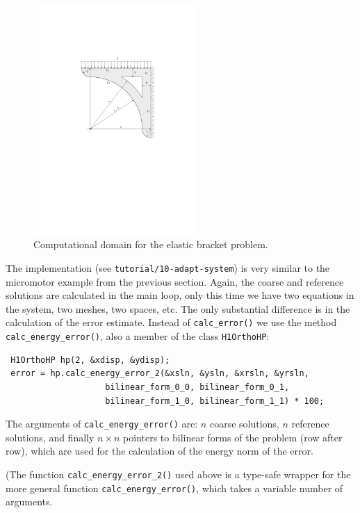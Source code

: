 \documentclass[11pt]{article}
\begin{document}
\begin{figure}[!ht]
  \medskip \centering
  \includegraphics[width=0.55\textwidth]{img/bracket}
  \vspace{-2mm}
  \caption{Computational domain for the elastic bracket problem.}
  \label{fig:bracket}
\end{figure}

The implementation (see {\tt tutorial/10-adapt-system}) is very similar to the micromotor
example from the previous section. Again, the coarse and reference solutions are calculated
in the main loop, only this time we have two equations in the system, two meshes, two spaces, etc.
The only substantial difference is in the calculation of the error estimate. Instead of
\verb"calc_error()" we use the method \verb"calc_energy_error()", also a member of the
class \verb"H1OrthoHP":

\begin{lstlisting}
 H1OrthoHP hp(2, &xdisp, &ydisp);
 error = hp.calc_energy_error_2(&xsln, &ysln, &xrsln, &yrsln,
                    bilinear_form_0_0, bilinear_form_0_1,
                    bilinear_form_1_0, bilinear_form_1_1) * 100;
\end{lstlisting}

The arguments of \verb"calc_energy_error()" are: $n$ coarse solutions, $n$ reference solutions,
and finally $n \times n$ pointers to bilinear forms of the problem (row after row), which are used
for the calculation of the energy norm of the error.

(The function \verb"calc_energy_error_2()" used above is a type-safe wrapper for the
more general function \verb"calc_energy_error()", which takes a variable number of arguments.
\end{document}
